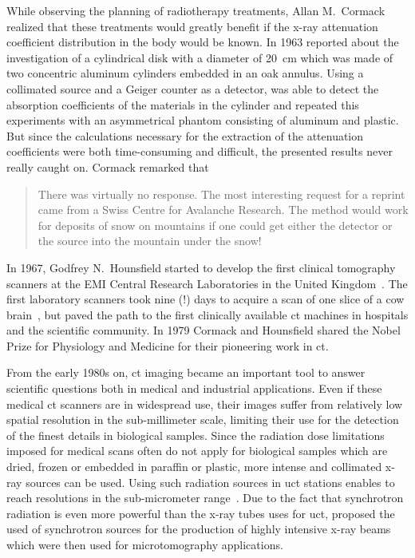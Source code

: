 While observing the planning of radiotherapy treatments, Allan M.\ Cormack realized that these treatments would greatly benefit if the x-ray attenuation coefficient distribution in the body would be known. In 1963 \citet{Cormack1963} reported about the investigation of a cylindrical disk with a diameter of \SI{20}{\centi\meter} which was made of two concentric aluminum cylinders embedded in an oak annulus. Using a collimated  source and a Geiger counter as a detector, \citeauthor{Cormack1963} was able to detect the absorption coefficients of the materials in the cylinder and repeated this experiments with an asymmetrical phantom consisting of aluminum and plastic. But since the calculations necessary for the extraction of the attenuation coefficients were both time-consuming and difficult, the presented results never really caught on. Cormack remarked that \begin{quote} There was virtually no response. The most interesting request for a reprint came from a Swiss Centre for Avalanche Research. The method would work for deposits of snow on mountains if one could get either the detector or the source into the mountain under the snow! \cite{Cormack1979}\end{quote}

In 1967, Godfrey N.\ Hounsfield started to develop the first clinical tomography scanners at the EMI Central Research Laboratories in the United Kingdom~\cite{Hsieh2003}. The first laboratory scanners took nine (!) days to acquire a scan of one slice of a cow brain~\cite{Hounsfield1976}, but paved the path to the first clinically available \ac{ct} machines in hospitals and the scientific community. In 1979 Cormack and Hounsfield shared the Nobel Prize for Physiology and Medicine for their pioneering work in \ac{ct}.

From the early 1980s on, \ac{ct} imaging became an important tool to answer scientific questions both in medical and industrial applications. Even if these medical \ac{ct} scanners are in widespread use, their images suffer from relatively low spatial resolution in the sub-millimeter scale, limiting their use for the detection of the finest details in biological samples. Since the radiation dose limitations imposed for medical scans often do not apply for biological samples which are dried, frozen or embedded in paraffin or plastic, more intense and collimated x-ray sources can be used. Using such radiation sources in \ac{uct} stations enables to reach resolutions in the sub-micrometer range~\cite{Bonse2008}. Due to the fact that synchrotron radiation is even more powerful than the x-ray tubes uses for \ac{uct}, \citet{Grodzins1983,Grodzins1983a} proposed the used of synchrotron sources for the production of highly intensive x-ray beams which were then used for microtomography applications.

